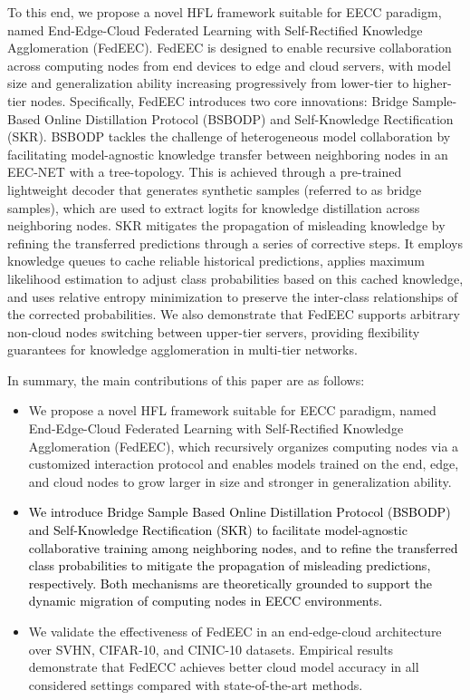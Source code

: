 \documentclass[10pt,journal]{IEEEtran}
\begin{document}


To this end, we propose a novel HFL framework suitable for EECC paradigm, named End-Edge-Cloud Federated Learning with Self-Rectified Knowledge Agglomeration (FedEEC). FedEEC is designed to enable recursive collaboration across computing nodes from end devices to edge and cloud servers, with model size and generalization ability increasing progressively from lower-tier to higher-tier nodes. Specifically, FedEEC introduces two core innovations: Bridge Sample-Based Online Distillation Protocol (BSBODP) and Self-Knowledge Rectification (SKR). BSBODP tackles the challenge of heterogeneous model collaboration by facilitating model-agnostic \cite{makd} knowledge transfer between neighboring nodes in an EEC-NET with a tree-topology. This is achieved through a pre-trained lightweight decoder that generates synthetic samples (referred to as bridge samples), which are used to extract logits for knowledge distillation across neighboring nodes. 
SKR mitigates the propagation of misleading knowledge by refining the transferred predictions through a series of corrective steps. It employs knowledge queues to cache reliable historical predictions, applies maximum likelihood estimation to adjust class probabilities based on this cached knowledge, and uses relative entropy minimization to preserve the inter-class relationships of the corrected probabilities. We also demonstrate that FedEEC supports arbitrary non-cloud nodes switching between upper-tier servers, providing flexibility guarantees for knowledge agglomeration in multi-tier networks.


In summary, the main contributions of this paper are as follows:
\begin{itemize}
    \item 
    We propose a novel HFL framework suitable for EECC paradigm, named End-Edge-Cloud Federated Learning with Self-Rectified Knowledge Agglomeration (FedEEC), which recursively organizes computing nodes via a customized interaction protocol and enables models trained on the end, edge, and cloud nodes to grow larger in size and stronger in generalization ability.
    \item 
    \textcolor{black}{We introduce Bridge Sample Based Online Distillation Protocol (BSBODP) and Self-Knowledge Rectification (SKR) to facilitate model-agnostic collaborative training among neighboring nodes, and to refine the transferred class probabilities to mitigate the propagation of misleading predictions, respectively. Both mechanisms are theoretically grounded to support the dynamic migration of computing nodes in EECC environments.}
    \item 
    We validate the effectiveness of FedEEC in an end-edge-cloud architecture over SVHN, CIFAR-10, and CINIC-10 datasets. Empirical results demonstrate that FedECC achieves better cloud model accuracy in all considered settings compared with state-of-the-art methods.
\end{itemize}
\end{document}
